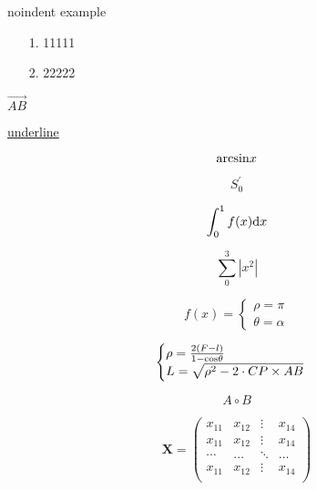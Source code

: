 \documentclass{cumcmthesis}
\begin{document}
	
	
	\noindent noindent example   \par %
		
		
	
	\begin{itemize}   %
		\item[1.]11111
		\item[2.]22222
	\end{itemize}   \par
	
	
	
	$\overrightarrow{AB}$     %
	
	
	
	\underline{underline}    %
	
	
	
	\[
	{\rm{arcsin}} x          %
	\]
	
	
	
	\[
	S _{0}^{\prime}          %
	\]
	
	
	
	\[
	\int _{0} ^{1} f(x) {\rm{d}} x    %
	\]
	
	
	
	\[
	\sum _0 ^3 |x^2|       %
	\]
	
	

	\[
		f(x)=					%
		\begin{cases}
			\rho = \pi   \\
			\theta = \alpha
		\end{cases}
	\]
	
	
	
	\[
		\begin{cases}           %
			\rho = \frac{2(F-l)}{1-{\rm{cos}}\theta} \\    %
			L=\sqrt{\rho^2 - 2 \cdot CP \times AB}         %
		\end{cases}
	\]
	
	
	\[
		A\circ B				%
	\]

	
	
	
	\[
		\mathbf {X} = \left(            %
		\begin{array}{cccc}
		
			x_{11} & x_{12} & \vdots & x_{14}\\
			x_{11} & x_{12} & \vdots & x_{14}\\
			\cdots & \ldots & \ddots & \ldots\\
			x_{11} & x_{12} & \vdots & x_{14}\\
		
		\end{array} \right)
	\]
\end{document}
